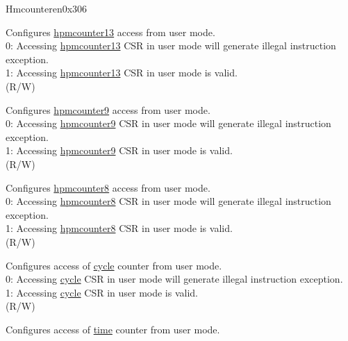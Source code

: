 \begin{register}{H}{mcounteren}{0x306}\label{regdesc:MCOUNTEREN}
%
%
%
%
%
%
%
%
%
\regnewline%
\begin{regdesc}\begin{reglist}
\label{fielddesc:MCOUNTEREN_HPM_13}\item [{HPM13}] Configures \hyperref[regdesc:HPMCOUNTER13] {hpmcounter13} access from user mode.\\
0: Accessing \hyperref[regdesc:HPMCOUNTER13] {hpmcounter13} CSR in user mode will generate illegal instruction exception. \\
1: Accessing \hyperref[regdesc:HPMCOUNTER13] {hpmcounter13} CSR in user mode is valid. \\
(R/W)
\label{fielddesc:MCOUNTEREN_HPM9}\item [{HPM9}] Configures \hyperref[regdesc:HPMCOUNTER9] {hpmcounter9} access from user mode.\\
0: Accessing \hyperref[regdesc:HPMCOUNTER9] {hpmcounter9} CSR in user mode will generate illegal instruction exception. \\
1: Accessing \hyperref[regdesc:HPMCOUNTER9] {hpmcounter9} CSR in user mode is valid. \\
(R/W)
\label{fielddesc:MCOUNTEREN_HPM_8}\item [{HPM8}] Configures \hyperref[regdesc:HPMCOUNTER8] {hpmcounter8} access from user mode.\\
0: Accessing \hyperref[regdesc:HPMCOUNTER8] {hpmcounter8} CSR in user mode will generate illegal instruction exception. \\
1: Accessing \hyperref[regdesc:HPMCOUNTER8] {hpmcounter8} CSR in user mode is valid. \\
(R/W)
\label{fielddesc:MCOUNTEREN_CY}\item [CY] Configures access of \hyperref[regdesc:CYCLE]{cycle} counter from user mode. \\
0: Accessing \hyperref[regdesc:CYCLE]{cycle} CSR in user mode will generate illegal instruction exception. \\
1: Accessing \hyperref[regdesc:CYCLE]{cycle} CSR in user mode is valid. \\
(R/W)
\label{fielddesc:MCOUNTEREN_TM}\item [TM] Configures access of \hyperref[regdesc:TIME]{time} counter from user mode. \\

\end{reglist}
\end{regdesc}
\end{register}
